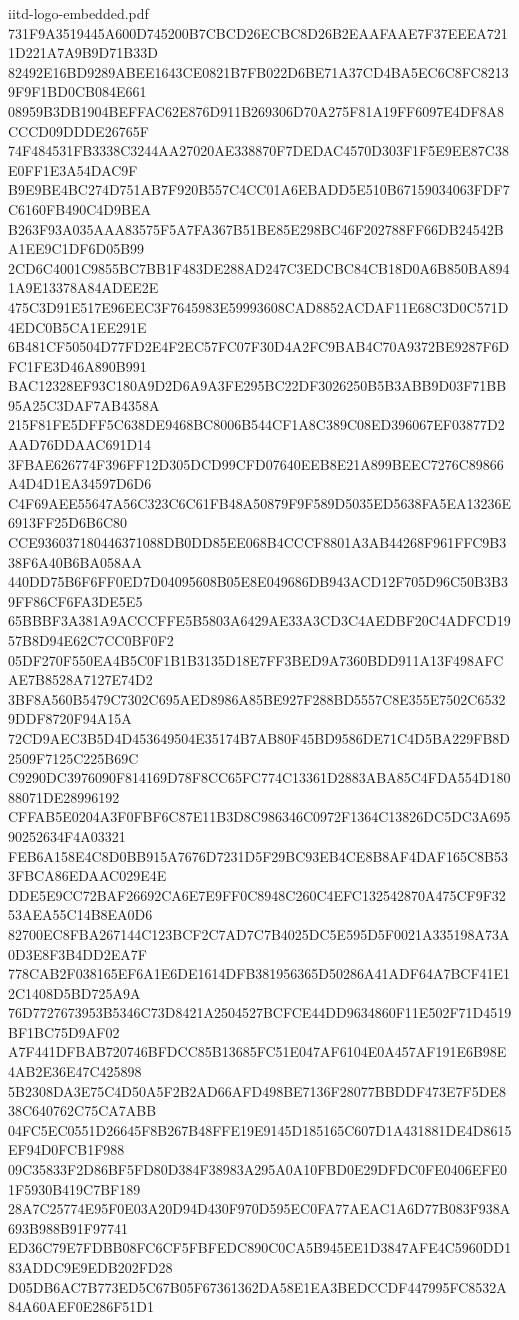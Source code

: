 \begin{filecontents*}[overwrite]{iitd-logo-embedded.pdf}
731F9A3519445A600D745200B7CBCD26ECBC8D26B2EAAFAAE7F37EEEA7211D221A7A9B9D71B33D
82492E16BD9289ABEE1643CE0821B7FB022D6BE71A37CD4BA5EC6C8FC82139F9F1BD0CB084E661
08959B3DB1904BEFFAC62E876D911B269306D70A275F81A19FF6097E4DF8A8CCCD09DDDE26765F
74F484531FB3338C3244AA27020AE338870F7DEDAC4570D303F1F5E9EE87C38E0FF1E3A54DAC9F
B9E9BE4BC274D751AB7F920B557C4CC01A6EBADD5E510B67159034063FDF7C6160FB490C4D9BEA
B263F93A035AAA83575F5A7FA367B51BE85E298BC46F202788FF66DB24542BA1EE9C1DF6D05B99
2CD6C4001C9855BC7BB1F483DE288AD247C3EDCBC84CB18D0A6B850BA8941A9E13378A84ADEE2E
475C3D91E517E96EEC3F7645983E59993608CAD8852ACDAF11E68C3D0C571D4EDC0B5CA1EE291E
6B481CF50504D77FD2E4F2EC57FC07F30D4A2FC9BAB4C70A9372BE9287F6DFC1FE3D46A890B991
BAC12328EF93C180A9D2D6A9A3FE295BC22DF3026250B5B3ABB9D03F71BB95A25C3DAF7AB4358A
215F81FE5DFF5C638DE9468BC8006B544CF1A8C389C08ED396067EF03877D2AAD76DDAAC691D14
3FBAE626774F396FF12D305DCD99CFD07640EEB8E21A899BEEC7276C89866A4D4D1EA34597D6D6
C4F69AEE55647A56C323C6C61FB48A50879F9F589D5035ED5638FA5EA13236E6913FF25D6B6C80
CCE936037180446371088DB0DD85EE068B4CCCF8801A3AB44268F961FFC9B338F6A40B6BA058AA
440DD75B6F6FF0ED7D04095608B05E8E049686DB943ACD12F705D96C50B3B39FF86CF6FA3DE5E5
65BBBF3A381A9ACCCFFE5B5803A6429AE33A3CD3C4AEDBF20C4ADFCD1957B8D94E62C7CC0BF0F2
05DF270F550EA4B5C0F1B1B3135D18E7FF3BED9A7360BDD911A13F498AFCAE7B8528A7127E74D2
3BF8A560B5479C7302C695AED8986A85BE927F288BD5557C8E355E7502C65329DDF8720F94A15A
72CD9AEC3B5D4D453649504E35174B7AB80F45BD9586DE71C4D5BA229FB8D2509F7125C225B69C
C9290DC3976090F814169D78F8CC65FC774C13361D2883ABA85C4FDA554D18088071DE28996192
CFFAB5E0204A3F0FBF6C87E11B3D8C986346C0972F1364C13826DC5DC3A69590252634F4A03321
FEB6A158E4C8D0BB915A7676D7231D5F29BC93EB4CE8B8AF4DAF165C8B533FBCA86EDAAC029E4E
DDE5E9CC72BAF26692CA6E7E9FF0C8948C260C4EFC132542870A475CF9F3253AEA55C14B8EA0D6
82700EC8FBA267144C123BCF2C7AD7C7B4025DC5E595D5F0021A335198A73A0D3E8F3B4DD2EA7F
778CAB2F038165EF6A1E6DE1614DFB381956365D50286A41ADF64A7BCF41E12C1408D5BD725A9A
76D7727673953B5346C73D8421A2504527BCFCE44DD9634860F11E502F71D4519BF1BC75D9AF02
A7F441DFBAB720746BFDCC85B13685FC51E047AF6104E0A457AF191E6B98E4AB2E36E47C425898
5B2308DA3E75C4D50A5F2B2AD66AFD498BE7136F28077BBDDF473E7F5DE838C640762C75CA7ABB
04FC5EC0551D26645F8B267B48FFE19E9145D185165C607D1A431881DE4D8615EF94D0FCB1F988
09C35833F2D86BF5FD80D384F38983A295A0A10FBD0E29DFDC0FE0406EFE01F5930B419C7BF189
28A7C25774E95F0E03A20D94D430F970D595EC0FA77AEAC1A6D77B083F938A693B988B91F97741
ED36C79E7FDBB08FC6CF5FBFEDC890C0CA5B945EE1D3847AFE4C5960DD183ADDC9E9EDB202FD28
D05DB6AC7B773ED5C67B05F67361362DA58E1EA3BEDCCDF447995FC8532A84A60AEF0E286F51D1

\end{filecontents*}
